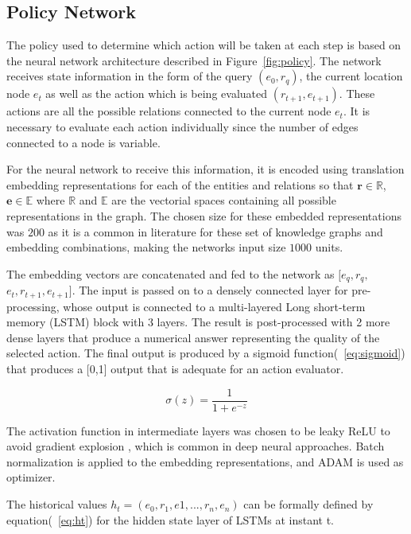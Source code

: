 \subsection{Policy Network}
\label{sec:spacerl-policy}

The policy used to determine which action will be taken at each step is based on the neural network architecture described in Figure~\ref{fig:policy}. The network receives state information in the form of the query $(e_0,r_q)$, the current location node $e_t$ as well as the action which is being evaluated $(r_{t+1}, e_{t+1})$. These actions are all the possible relations connected to the current node $e_t$. It is necessary to evaluate each action individually since the number of edges connected to a node is variable.

For the neural network to receive this information, it is encoded using translation embedding representations for each of the entities and relations so that  $\textbf{r} \in \mathbb{R}$, $\textbf{e} \in \mathbb{E}$ where $\mathbb{R}$ and $\mathbb{E}$ are the vectorial spaces containing all possible representations in the graph. The chosen size for these embedded representations was $200$ as it is a common in literature for these set of knowledge graphs and embedding combinations, making the networks input size $1000$ units.

The embedding vectors are concatenated and fed to the network as $[e_q,r_q,$ \\$e_t,r_{t+1},e_{t+1}]$. The input is passed on to a densely connected layer for pre-processing, whose output is connected to a multi-layered Long short-term memory (LSTM) \cite{hochreiter1997long} block with 3 layers. The result is post-processed with 2 more dense layers that produce a numerical answer representing the quality of the selected action. The final output is produced by a sigmoid function(~\ref{eq:sigmoid}) that produces a [0,1] output that is adequate for an action evaluator.

\begin{equation}
\label{eq:sigmoid}
    \sigma(z) = \frac{1} {1 + e^{-z}}
\end{equation}

The activation function in intermediate layers was chosen to be leaky ReLU to avoid gradient explosion \cite{bengio1994learning}, which is common in deep neural approaches. Batch normalization is applied to the embedding representations, and ADAM \cite{kingma2014adam} is used as optimizer. 

The historical values $h_t = (e_0,r_1,e1,...,r_n,e_n)$ can be formally defined by equation(~\ref{eq:ht}) for the hidden state layer of LSTMs at instant t.

